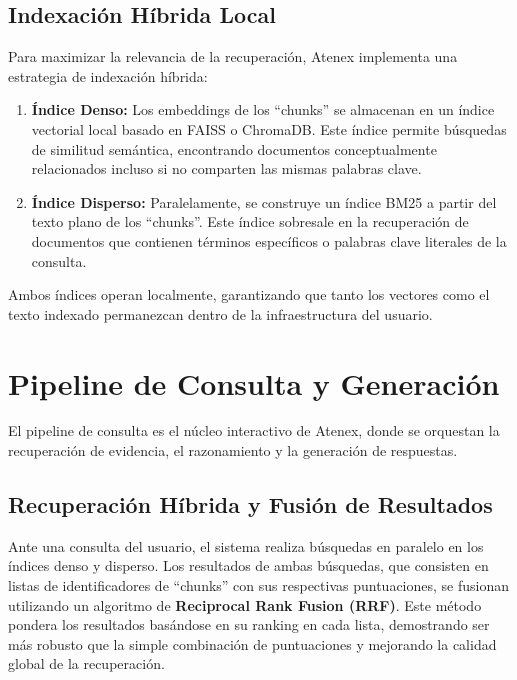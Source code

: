 \subsection{Indexación Híbrida Local}
Para maximizar la relevancia de la recuperación, Atenex implementa una estrategia de indexación híbrida:
\begin{enumerate}
    \item \textbf{Índice Denso:} Los embeddings de los ``chunks'' se almacenan en un índice vectorial local basado en FAISS o ChromaDB. Este índice permite búsquedas de similitud semántica, encontrando documentos conceptualmente relacionados incluso si no comparten las mismas palabras clave.
    \item \textbf{Índice Disperso:} Paralelamente, se construye un índice BM25 a partir del texto plano de los ``chunks''. Este índice sobresale en la recuperación de documentos que contienen términos específicos o palabras clave literales de la consulta.
\end{enumerate}
Ambos índices operan localmente, garantizando que tanto los vectores como el texto indexado permanezcan dentro de la infraestructura del usuario.

\section{Pipeline de Consulta y Generación}

El pipeline de consulta es el núcleo interactivo de Atenex, donde se orquestan la recuperación de evidencia, el razonamiento y la generación de respuestas.

\subsection{Recuperación Híbrida y Fusión de Resultados}
Ante una consulta del usuario, el sistema realiza búsquedas en paralelo en los índices denso y disperso. Los resultados de ambas búsquedas, que consisten en listas de identificadores de ``chunks'' con sus respectivas puntuaciones, se fusionan utilizando un algoritmo de \textbf{Reciprocal Rank Fusion (RRF)}. Este método pondera los resultados basándose en su ranking en cada lista, demostrando ser más robusto que la simple combinación de puntuaciones y mejorando la calidad global de la recuperación.

